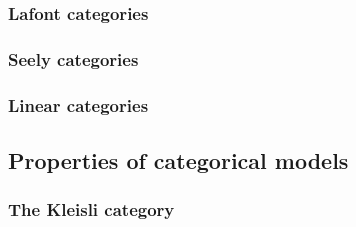 \subsubsection{Lafont categories}\label{lafont-categories}

\subsubsection{Seely categories}\label{seely-categories}

\subsubsection{Linear categories}\label{linear-categories}

\subsection{Properties of categorical models}\label{properties-of-categorical-models}

\subsubsection{The Kleisli category}\label{the-kleisli-category}

